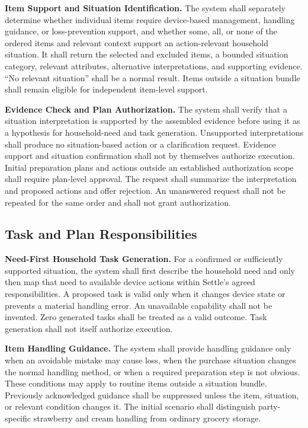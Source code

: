 \documentclass[conference]{IEEEtran}
\newcommand{\req}[1]{\par\addvspace{3pt}\noindent\textbf{#1}}
\begin{document}
\req{Item Support and Situation Identification.}
The system shall separately determine whether individual items require device-based management, handling guidance, or loss-prevention support, and whether some, all, or none of the ordered items and relevant context support an action-relevant household situation. It shall return the selected and excluded items, a bounded situation category, relevant attributes, alternative interpretations, and supporting evidence. ``No relevant situation'' shall be a normal result. Items outside a situation bundle shall remain eligible for independent item-level support.

\req{Evidence Check and Plan Authorization.}
The system shall verify that a situation interpretation is supported by the assembled evidence before using it as a hypothesis for household-need and task generation. Unsupported interpretations shall produce no situation-based action or a clarification request. Evidence support and situation confirmation shall not by themselves authorize execution. Initial preparation plans and actions outside an established authorization scope shall require plan-level approval. The request shall summarize the interpretation and proposed actions and offer rejection. An unanswered request shall not be repeated for the same order and shall not grant authorization.

\subsection{Task and Plan Responsibilities}

\req{Need-First Household Task Generation.}
For a confirmed or sufficiently supported situation, the system shall first describe the household need and only then map that need to available device actions within Settle's agreed responsibilities. A proposed task is valid only when it changes device state or prevents a material handling error. An unavailable capability shall not be invented. Zero generated tasks shall be treated as a valid outcome. Task generation shall not itself authorize execution.

\req{Item Handling Guidance.}
The system shall provide handling guidance only when an avoidable mistake may cause loss, when the purchase situation changes the normal handling method, or when a required preparation step is not obvious. These conditions may apply to routine items outside a situation bundle. Previously acknowledged guidance shall be suppressed unless the item, situation, or relevant condition changes it. The initial scenario shall distinguish party-specific strawberry and cream handling from ordinary grocery storage.
\end{document}

